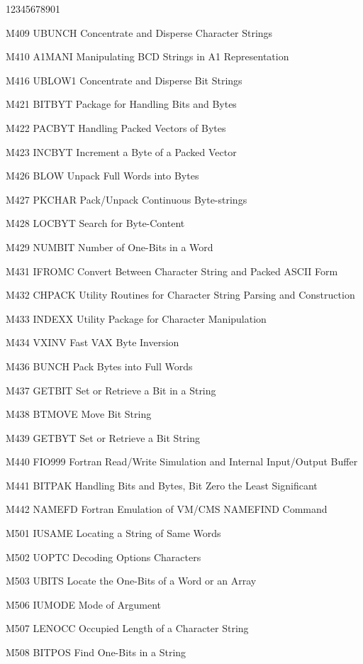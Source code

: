 \begin{DLtt}{12345678901}
\item[M409 UBUNCH] Concentrate and Disperse Character Strings
\item[M410 A1MANI] Manipulating BCD Strings in A1 Representation
\item[M416 UBLOW1] Concentrate and Disperse Bit Strings
\item[M421 BITBYT] Package for Handling Bits and Bytes
\item[M422 PACBYT] Handling Packed Vectors of Bytes
\item[M423 INCBYT] Increment a Byte of a Packed Vector
\item[M426 BLOW] Unpack Full Words into Bytes
\item[M427 PKCHAR] Pack/Unpack Continuous Byte-strings
\item[M428 LOCBYT] Search for Byte-Content
\item[M429 NUMBIT] Number of One-Bits in a Word
\item[M431 IFROMC] Convert Between Character String and Packed ASCII Form
\item[M432 CHPACK] Utility Routines for Character String Parsing and Construction
\item[M433 INDEXX] Utility Package for Character Manipulation
\item[M434 VXINV] Fast VAX Byte Inversion
\item[M436 BUNCH] Pack Bytes into Full Words
\item[M437 GETBIT] Set or Retrieve a Bit in a String
\item[M438 BTMOVE] Move Bit String
\item[M439 GETBYT] Set or Retrieve a Bit String
\item[M440 FIO999] Fortran Read/Write Simulation and Internal Input/Output Buffer
\item[M441 BITPAK] Handling Bits and Bytes, Bit Zero the Least Significant
\item[M442 NAMEFD] Fortran Emulation of VM/CMS NAMEFIND Command
\item[M501 IUSAME] Locating a String of Same Words
\item[M502 UOPTC] Decoding Options Characters
\item[M503 UBITS] Locate the One-Bits of a Word or an Array 
\item[M506 IUMODE] Mode of Argument
\item[M507 LENOCC] Occupied Length of a Character String
\item[M508 BITPOS] Find One-Bits in a String
\end{DLtt}

